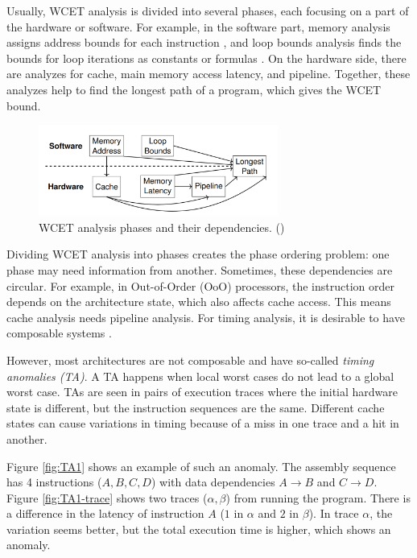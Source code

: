 Usually, WCET analysis is divided into several phases, each focusing on a part of the hardware or software. For example, in the software part, memory analysis assigns address bounds for each instruction \cite{Harrison_Ranges_1977}, and loop bounds analysis finds the bounds for loop iterations as constants or formulas \cite{Healy_bounding_1998}. On the hardware side, there are analyzes for cache, main memory access latency, and pipeline. Together, these analyzes help to find the longest path of a program, which gives the WCET bound.

\begin{figure}
    \centering
    \includegraphics[width=0.7\textwidth]{figures/wcet-deps.png}
    \caption{WCET analysis phases and their dependencies. ()}
    \label{fig:wcet-deps}
\end{figure}

Dividing WCET analysis into phases creates the phase ordering problem: one phase may need information from another. Sometimes, these dependencies are circular. For example, in Out-of-Order (OoO) processors, the instruction order depends on the architecture state, which also affects cache access. This means cache analysis needs pipeline analysis. For timing analysis, it is desirable to have composable systems \cite{Puschner_computing_1997}.

However, most architectures are not composable and have so-called \textit{timing anomalies (TA)}. A TA happens when local worst cases do not lead to a global worst case. TAs are seen in pairs of execution traces where the initial hardware state is different, but the instruction sequences are the same. Different cache states can cause variations in timing because of a miss in one trace and a hit in another.

\begin{example}
Figure \ref{fig:TA1} shows an example of such an anomaly. The assembly sequence has 4 instructions ($A,B,C,D$) with data dependencies $A \rightarrow B$ and $C \rightarrow D$. Figure \ref{fig:TA1-trace} shows two traces ($\alpha, \beta$) from running the program. There is a difference in the latency of instruction $A$ ($1$ in $\alpha$ and $2$ in $\beta$). In trace $\alpha$, the variation seems better, but the total execution time is higher, which shows an anomaly.
\label{ex:simple-ta}
\end{example}

